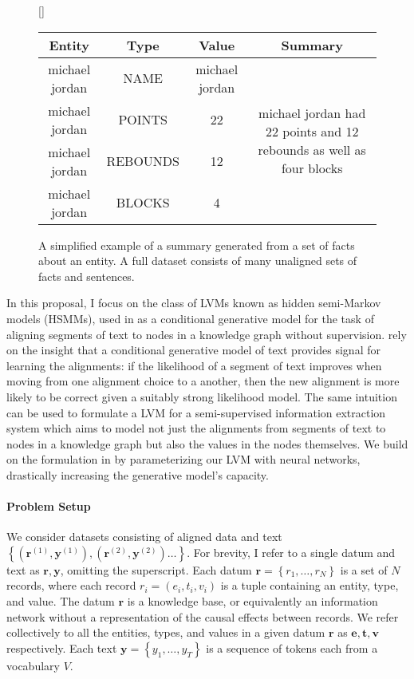 \documentclass[12pt]{article}
\newcommand\set[1]{\left\{#1\right\}}
\newcommand{\be}{\mathbf{e}}
\newcommand{\br}{\mathbf{r}}
\newcommand{\bt}{\mathbf{t}}
\newcommand{\bv}{\mathbf{v}}
\newcommand{\by}{\mathbf{y}}
\begin{document}
\begin{figure}[t]
\centering
{}[\FBwidth]
{\caption{A simplified example of a summary generated from a set of facts about an entity.
A full dataset consists of many unaligned sets of facts and sentences.}
\label{fig:boxscore}}
{\small\begin{tabular}{ccc|c}
\toprule
Entity & Type & Value & Summary\\
\midrule
michael jordan & NAME & michael jordan &
\multirow{4}{*}{\parbox{4cm}{michael jordan had 22 points and 12 rebounds as well as four blocks}}\\
michael jordan & POINTS & 22 &\\
michael jordan & REBOUNDS & 12 & \\
michael jordan & BLOCKS & 4 &\\
\bottomrule
\end{tabular}}
\end{figure}

In this proposal, I focus on the class of LVMs known as hidden semi-Markov models (HSMMs),
used in \citet{liang2009semalign} as a conditional generative model for the
task of aligning segments of text to nodes in a knowledge graph without supervision.
\citet{liang2009semalign} rely on the insight that a conditional generative model of text
provides signal for learning the alignments:
if the likelihood of a segment of text improves when moving from
one alignment choice to a another,
then the new alignment is more likely to be correct given a suitably strong likelihood model.
The same intuition can be used to formulate a LVM for a semi-supervised information extraction system
which aims to model not just the alignments from segments of text to nodes in a knowledge graph
but also the values in the nodes themselves.
We build on the formulation in \citet{liang2009semalign} by parameterizing our LVM
with neural networks, drastically increasing the generative model's capacity.

\paragraph{Problem Setup}
We consider datasets consisting of aligned data and text
$\set{(\br^{(1)}, \by^{(1)}),(\br^{(2)},\by^{(2)})\ldots}$.
For brevity, I refer to a single datum and text as $\br,\by$, omitting the superscript.
Each datum $\br = \set{r_1,\ldots,r_N}$ is a set of $N$ records, where each record $r_i = (e_i, t_i, v_i)$
is a tuple containing an entity, type, and value.
The datum $\br$ is a knowledge base, or equivalently an information network
without a representation of the causal effects between records.
We refer collectively to all the entities, types, and values in a given datum $\br$ as
$\be,\bt,\bv$ respectively.
Each text $\by = \set{y_1,\ldots,y_T}$ is a sequence of tokens each from a vocabulary $V$.
\end{document}
